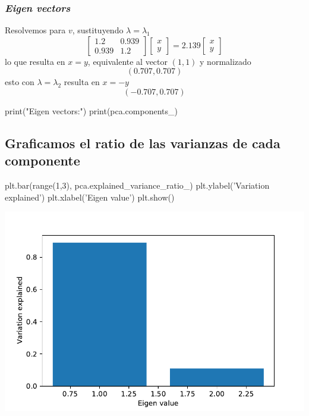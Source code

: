 \subsubsection{\textit{Eigen vectors}}
\begin{minipage}[c]{0.48\textwidth}
Resolvemos para $v$, sustituyendo $\lambda=\lambda_1$
\[ \begin{bmatrix}
1.2 & 0.939\\
0.939 & 1.2
\end{bmatrix}
\begin{bmatrix}
x\\
y
\end{bmatrix} = 2.139
\begin{bmatrix}
x\\
y
\end{bmatrix}\]
lo que resulta en $x=y$, equivalente al vector $(1,1)$ y normalizado\vspace{-0.4em}
\[ (0.707, 0.707) \]
esto con $\lambda=\lambda_2$ resulta en $x=-y$\vspace{-0.4em}
\[ (-0.707, 0.707) \]
\end{minipage}
\hfill\vrule\hfill
\begin{minipage}[c]{0.48\textwidth}
\begin{jupyter}{7}
print("Eigen vectors:")
print(pca.components_)
\end{jupyter}
\end{minipage}\newpage

\subsection{Graficamos el ratio de las varianzas de cada componente}
\begin{jupyter}{8}
plt.bar(range(1,3), pca.explained_variance_ratio_)
plt.ylabel('Variation explained')
plt.xlabel('Eigen value')
plt.show()
\end{jupyter}
\begin{center}
\includegraphics[scale=0.75]{media/profesores/barras.pdf}
\end{center}

